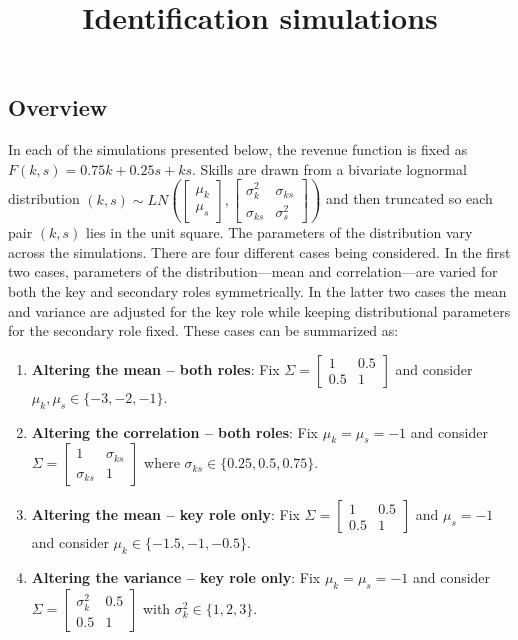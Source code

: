 \documentclass{article}
\title{Identification simulations}
\author{}
\date{}
\begin{document}
	
	\maketitle
	\vspace{-1.5cm}
	
	\subsection*{Overview}
	
	In each of the simulations presented below, the revenue function is fixed as $F(k,s) = 0.75k + 0.25s + ks$. Skills are drawn from a bivariate lognormal distribution $(k,s) \sim LN\left(\begin{bmatrix}
		\mu_k \\ 
		\mu_s
	\end{bmatrix}, 
	\begin{bmatrix}
		\sigma^2_{k} & \sigma_{ks} \\
		\sigma_{ks} & \sigma^2_{s}
	\end{bmatrix}\right)$ and then truncated so each pair $(k,s)$ lies in the unit square. The parameters of the distribution vary across the simulations. There are four different cases being considered. In the first two cases, parameters of the distribution---mean and correlation---are varied for both the key and secondary roles symmetrically. In the latter two cases the mean and variance are adjusted for the key role while keeping distributional parameters for the secondary role fixed. These cases can be summarized as:
	\begin{enumerate}
		\item \textbf{Altering the mean -- both roles}: Fix $\Sigma = \begin{bmatrix}
			1 & 0.5 \\
		0.5 & 1
		\end{bmatrix}$ and consider $\mu_k,\mu_s \in \{-3,-2,-1\}$.
			\item \textbf{Altering the correlation -- both roles}: Fix $\mu_k = \mu_s = -1$ and consider $\Sigma = \begin{bmatrix}
			1 & \sigma_{ks} \\
			\sigma_{ks} & 1
		\end{bmatrix}$ where $\sigma_{ks}\in\{0.25,0.5,0.75\}$.
		\item \textbf{Altering the mean -- key role only}: Fix $\Sigma = \begin{bmatrix}
			1 & 0.5 \\
			0.5 & 1
		\end{bmatrix}$ and $\mu_s = -1$ and consider $\mu_k \in \{-1.5,-1,-0.5\}$.
		\item \textbf{Altering the variance -- key role only}: Fix $\mu_k = \mu_s = - 1$ and consider $\Sigma = \begin{bmatrix}
			\sigma^2_k & 0.5 \\
			0.5 & 1
		\end{bmatrix}$ with $\sigma^2_k \in \{1,2,3\}$.
	\end{enumerate}
	
\end{document}
